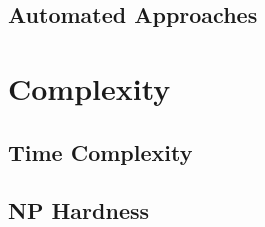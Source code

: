 \documentclass{article}
\begin{document}
\subsection{Automated Approaches}
\label{subsec:automated_techniques}

\section{Complexity}
\label{sec:complexity}

\subsection{Time Complexity}
\label{subsec:time_comp}

\subsection{NP Hardness}
\label{subsec:np_hardness}

\newpage


\end{document}
